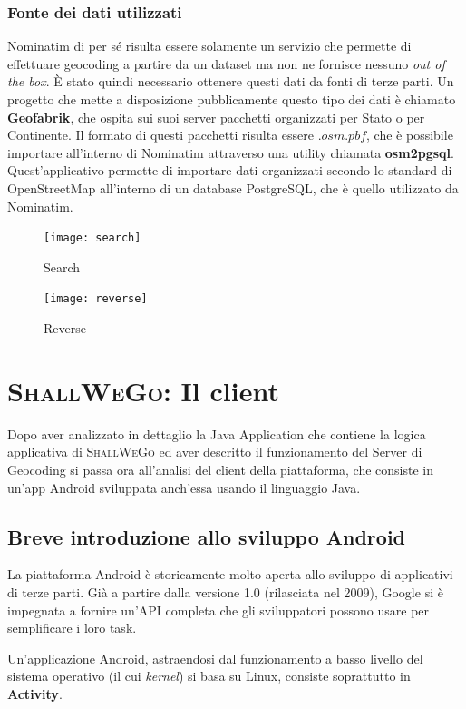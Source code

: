         \subsubsection{Fonte dei dati utilizzati}
            Nominatim di per sé risulta essere solamente un servizio che permette di effettuare geocoding a partire da un dataset ma non ne fornisce nessuno \textit{out of the box}. È stato quindi necessario ottenere questi dati da fonti di terze parti. Un progetto che mette a disposizione pubblicamente questo tipo dei dati è chiamato \textbf{Geofabrik}, che ospita sui suoi server pacchetti organizzati per Stato o per Continente. Il formato di questi pacchetti risulta essere $.osm.pbf$, che è possibile importare all'interno di Nominatim attraverso una utility chiamata \textbf{osm2pgsql}. Quest'applicativo permette di importare dati organizzati secondo lo standard di OpenStreetMap all'interno di un database PostgreSQL, che è quello utilizzato da Nominatim.

        \begin{figure}[H]
            \centering
            \texttt{[image: search]}
            \caption{Search}
            \vspace{0.5cm}
            \texttt{[image: reverse]}
            \caption{Reverse}
        \end{figure}

        \section{\textsc{ShallWeGo}: Il client}
            Dopo aver analizzato in dettaglio la Java Application che contiene la logica applicativa di \textsc{ShallWeGo} ed aver descritto il funzionamento del Server di Geocoding si passa ora all'analisi del client della piattaforma, che consiste in un'app Android sviluppata anch'essa usando il linguaggio Java.

        \subsection{Breve introduzione allo sviluppo Android}
            La piattaforma Android è storicamente molto aperta allo sviluppo di applicativi di terze parti. Già a partire dalla versione 1.0 (rilasciata nel 2009), Google si è impegnata a fornire un'API completa che gli sviluppatori possono usare per semplificare i loro task.

            Un'applicazione Android, astraendosi dal funzionamento a basso livello del sistema operativo (il cui \textit{kernel}) si basa su Linux, consiste soprattutto in \textbf{Activity}.

